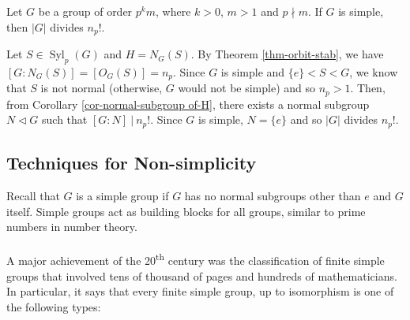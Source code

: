 \begin{proposition}\label{prop-simple-group-of-order-p^kq}
	Let $G$ be a group of order $p^km$, where $k > 0$, $m > 1$ and $p \nmid m$. If $G$ is simple, then $|G|$ divides $n_p!$.
\end{proposition}
\begin{sketch}
	Let $S \in \operatorname{Syl}_p(G)$ and $H = N_G(S)$. By Theorem \ref{thm-orbit-stab}, we have $[G:N_G(S)] = [O_G(S)] = n_p$. Since $G$ is simple and $\{e\} < S < G$, we know that $S$ is not normal (otherwise, $G$ would not be simple) and so $n_p > 1$. Then, from Corollary \ref{cor-normal-subgroup of-H}, there exists a normal subgroup $N \lhd G$ such that $[G:N] ~|~ n_p!$. Since $G$ is simple, $N = \{e\}$ and so $|G|$ divides $n_p!$.
\end{sketch}

\subsection{Techniques for Non-simplicity}
Recall that $G$ is a simple group if $G$ has no normal subgroups other than $e$ and $G$ itself. Simple groups act as building blocks for all groups, similar to prime numbers in number theory. 
\\\\ A major achievement of the 20\textsuperscript{th} century was the classification of finite simple groups that involved tens of thousand of pages and hundreds of mathematicians. In particular, it says that every finite simple group, up to isomorphism is one of the following types:

